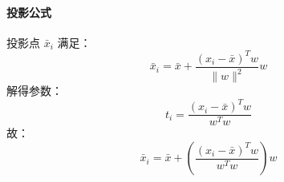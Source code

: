 \paragraph{投影公式}  
投影点 \(\bar{x}_i\) 满足：
\[
\bar{x}_i = \bar{x} + \frac{(x_i - \bar{x})^T w}{\|w\|^2} w
\]
解得参数：
\[
t_i = \frac{(x_i - \bar{x})^T w}{w^T w}
\]
故：
\[
\bar{x}_i = \bar{x} + \left( \frac{(x_i - \bar{x})^T w}{w^T w} \right) w
\]